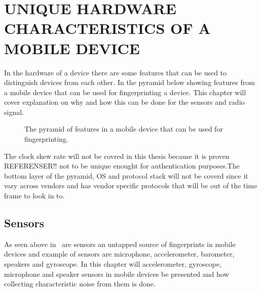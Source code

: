 \chapter{UNIQUE HARDWARE CHARACTERISTICS OF A MOBILE DEVICE}\label{cha:character}
In the hardware of a device there are some features that can be used to distinguish devices from each other. In the pyramid below showing features from a mobile device that can be used for fingerprinting a device. This chapter will cover explanation on why and how this can be done for the sensors and radio signal.
\begin{figure}[!h]
	
	\caption{\label{fig:pyramid} The pyramid of features in a mobile device that can be used for fingerprinting.\cite[]{sensor:acoustic}}
\end{figure}
The clock skew rate will not be covred in this thesis because it is proven REFERENSER!! not to be unique enought for authentication purposes.The bottom layer of the pyramid, OS and protocol stack will not be coverd since it vary across vendors and has vendor specific protocols that will be out of the time frame to look in to.

\section{Sensors}\label{sec:sensors}
As seen above in~ are sensors an untapped source of fingerprints in mobile devices and example of sensors are microphone, accelerometer, barometer, speakers and gyroscope. In this chapter will accelerometer, gyroscope, microphone and speaker sensors in mobile devices be presented and how collecting characteristic noise from them is done.

